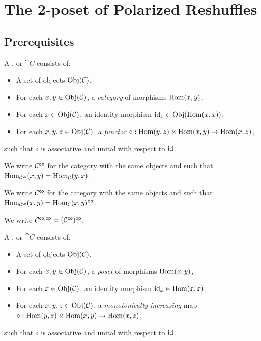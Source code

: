 \documentclass[a4paper]{memoir}
\begin{document}
\section{The 2-poset of Polarized Reshuffles} \label{sec:poresh}

\subsection{Prerequisites}
\begin{definition}
	A ,  or  $\cat C$ consists of:
	\begin{itemize}
		\item A set of objects $\mathrm{Obj}(\mathcal{C})$,
		\item For each $x, y \in \mathrm{Obj}(\mathcal{C})$, a \emph{category} of morphisms ${\mathrm{Hom}}(x, y)$,
		\item For each $x \in \mathrm{Obj}(\mathcal{C})$, an identity morphism $\mathrm{id}_x \in \mathrm{Obj}({\mathrm{Hom}}(x, x))$,
		\item For each $x, y, z \in \mathrm{Obj}(\mathcal{C})$, a \emph{functor} $\circ : {\mathrm{Hom}}(y, z) \times {\mathrm{Hom}}(x, y) \to {\mathrm{Hom}}(x, z)$,
	\end{itemize}
	such that $\circ$ is associative and unital with respect to $\mathrm{id}$.
	
	We write ${\mathcal{C}}^{\mathsf{op}}$ for the category with the same objects and such that ${\mathrm{Hom}}_{{\mathcal{C}}^{\mathsf{op}}}(x, y) = {\mathrm{Hom}}_{\mathcal{C}}(y, x)$.
	
	We write ${\mathcal{C}}^{\mathsf{co}}$ for the category with the same objects and such that ${\mathrm{Hom}}_{{\mathcal{C}}^{\mathsf{co}}}(x, y) = {\mathrm{Hom}}_{{\mathcal{C}}}(x, y)^{\mathsf{op}}$.
	
	We write ${\mathcal{C}}^{\mathsf{co};\mathsf{op}} = ({\mathcal{C}}^{\mathsf{co}})^{\mathsf{op}}$.
\end{definition}
\begin{definition}
	A ,  or  $\cat C$ consists of:
	\begin{itemize}
		\item A set of objects $\mathrm{Obj}(\mathcal{C})$,
		\item For each $x, y \in \mathrm{Obj}(\mathcal{C})$, a \emph{poset} of morphisms ${\mathrm{Hom}}(x, y)$,
		\item For each $x \in \mathrm{Obj}(\mathcal{C})$, an identity morphism $\mathrm{id}_x \in {\mathrm{Hom}}(x, x)$,
		\item For each $x, y, z \in \mathrm{Obj}(\mathcal{C})$, a \emph{monotonically increasing} map $\circ : {\mathrm{Hom}}(y, z) \times {\mathrm{Hom}}(x, y) \to {\mathrm{Hom}}(x, z)$,
	\end{itemize}
	such that $\circ$ is associative and unital with respect to $\mathrm{id}$.
\end{definition}
\end{document}

